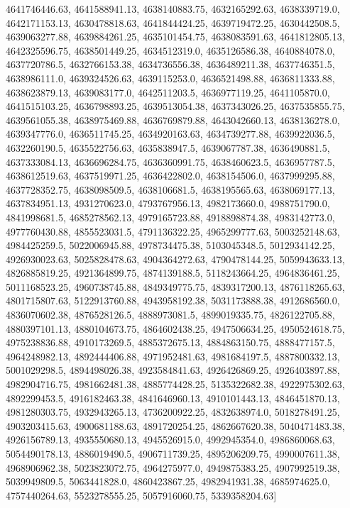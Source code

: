 4641746446.63, 4641588941.13, 4638140883.75, 4632165292.63, 4638339719.0, 4642171153.13, 4630478818.63, 4641844424.25, 4639719472.25, 4630442508.5, 4639063277.88, 4639884261.25, 4635101454.75, 4638083591.63, 4641812805.13, 4642325596.75, 4638501449.25, 4634512319.0, 4635126586.38, 4640884078.0, 4637720786.5, 4632766153.38, 4634736556.38, 4636489211.38, 4637746351.5, 4638986111.0, 4639324526.63, 4639115253.0, 4636521498.88, 4636811333.88, 4638623879.13, 4639083177.0, 4642511203.5, 4636977119.25, 4641105870.0, 4641515103.25, 4636798893.25, 4639513054.38, 4637343026.25, 4637535855.75, 4639561055.38, 4638975469.88, 4636769879.88, 4643042660.13, 4638136278.0, 4639347776.0, 4636511745.25, 4634920163.63, 4634739277.88, 4639922036.5, 4632260190.5, 4635522756.63, 4635838947.5, 4639067787.38, 4636490881.5, 4637333084.13, 4636696284.75, 4636360991.75, 4638460623.5, 4636957787.5, 4638612519.63, 4637519971.25, 4636422802.0, 4638154506.0, 4637999295.88, 4637728352.75, 4638098509.5, 4638106681.5, 4638195565.63, 4638069177.13, 4637834951.13, 4931270623.0, 4793767956.13, 4982173660.0, 4988751790.0, 4841998681.5, 4685278562.13, 4979165723.88, 4918898874.38, 4983142773.0, 4977760430.88, 4855523031.5, 4791136322.25, 4965299777.63, 5003252148.63, 4984425259.5, 5022006945.88, 4978734475.38, 5103045348.5, 5012934142.25, 4926930023.63, 5025828478.63, 4904364272.63, 4790478144.25, 5059943633.13, 4826885819.25, 4921364899.75, 4874139188.5, 5118243664.25, 4964836461.25, 5011168523.25, 4960738745.88, 4849349775.75, 4839317200.13, 4876118265.63, 4801715807.63, 5122913760.88, 4943958192.38, 5031173888.38, 4912686560.0, 4836070602.38, 4876528126.5, 4888973081.5, 4899019335.75, 4826122705.88, 4880397101.13, 4880104673.75, 4864602438.25, 4947506634.25, 4950524618.75, 4975238836.88, 4910173269.5, 4885372675.13, 4884863150.75, 4888477157.5, 4964248982.13, 4892444406.88, 4971952481.63, 4981684197.5, 4887800332.13, 5001029298.5, 4894498026.38, 4923584841.63, 4926426869.25, 4926403897.88, 4982904716.75, 4981662481.38, 4885774428.25, 5135322682.38, 4922975302.63, 4892299453.5, 4916182463.38, 4841646960.13, 4910101443.13, 4846451870.13, 4981280303.75, 4932943265.13, 4736200922.25, 4832638974.0, 5018278491.25, 4903203415.63, 4900681188.63, 4891720254.25, 4862667620.38, 5040471483.38, 4926156789.13, 4935550680.13, 4945526915.0, 4992945354.0, 4986860068.63, 5054490178.13, 4886019490.5, 4906711739.25, 4895206209.75, 4990007611.38, 4968906962.38, 5023823072.75, 4964275977.0, 4949875383.25, 4907992519.38, 5039949809.5, 5063441828.0, 4860423867.25, 4982941931.38, 4685974625.0, 4757440264.63, 5523278555.25, 5057916060.75, 5339358204.63]
